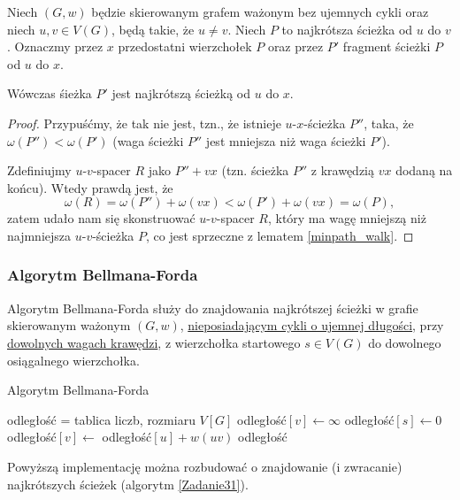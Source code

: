 \begin{lemma}
	Niech $(G, w)$ będzie skierowanym grafem ważonym
	bez ujemnych cykli oraz niech $u, v \in V(G)$,
	będą takie, że $u \not = v$. Niech $P$ to 
	najkrótsza ścieżka od $u$ do $v$. Oznaczmy przez
	$x$ przedostatni wierzchołek $P$ oraz 
	przez $P'$ fragment ścieżki $P$ od $u$ do $x$.
	
	Wówczas śieżka $P'$ jest najkrótszą ścieżką od $u$ do 
	$x$.
	
	\begin{proof}
		Przypuśćmy, że tak nie jest, tzn., że istnieje 
		$u$-$x$-ścieżka $P''$, taka, że 
		$\omega(P'') < \omega(P')$ (waga ścieżki $P''$
		jest mniejsza niż waga ścieżki $P'$).
		
		Zdefiniujmy $u$-$v$-spacer $R$ jako $P'' + vx$
		(tzn. ścieżka $P''$ z krawędzią $vx$ 
		dodaną na końcu). Wtedy prawdą jest, że
		\[\omega(R) = \omega(P'') + \omega(vx) <
		\omega(P') + \omega(vx) = \omega(P),\]
		zatem udało nam się skonstruować 
		$u$-$v$-spacer $R$, który ma wagę mniejszą niż
		najmniejsza $u$-$v$-ścieżka $P$, co 
		jest sprzeczne z lematem \ref{minpath_walk}.
	\end{proof}
	\label{minpath_subpath}
\end{lemma}
\subsubsection{Algorytm Bellmana-Forda}
Algorytm Bellmana-Forda służy do znajdowania 
najkrótszej ścieżki w grafie skierowanym ważonym $(G, w)$,
\ul{nieposiadającym cykli o ujemnej długości}, przy 
\ul{dowolnych wagach krawędzi}, %
z wierzchołka startowego $s \in V(G)$
do dowolnego osiągalnego wierzchołka.

\begin{algorithm}[H]
	\caption{Algorytm Bellmana-Forda}\label{bellmanford_alg}
	\begin{algorithmic}[1]
		\State odległość = tablica liczb, rozmiaru $V[G]$
		\State odległość$[v] \gets \infty$
		\EndFor
		\State odległość$[s] \gets 0$
		\State odległość$[v] \gets$ odległość$[u] + w(uv)$ 
		\EndIf
		\EndFor
		\EndFor
		\State \Return odległość
		\EndProcedure
	\end{algorithmic}
	\label{bellman_ford}
\end{algorithm}
Powyższą implementację można rozbudować o
znajdowanie (i zwracanie) najkrótszych ścieżek
(algorytm \ref{Zadanie31}).

